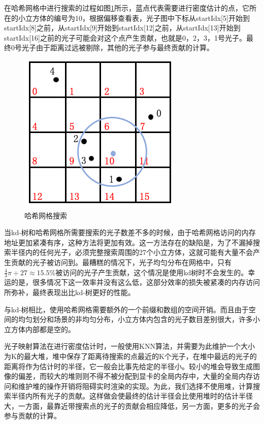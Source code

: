 \documentclass[UTF8]{ctexart}
\begin{document}
    在哈希网格中进行搜索的过程如图\ref{fig:2}所示，蓝点代表需要进行密度估计的点，它所在的小立方体的编号为10，根据偏移查看表，光子图中下标从startIdx[5]开始到startIdx[8]之前，从startIdx[9]开始到startIdx[12]之前，从startIdx[13]开始到startIdx[16]之前的光子可能会对这个点产生贡献，也就是0，2，3，1号光子。最终0号光子由于距离过远被剔除，其他的光子参与最终贡献的计算。
    
    \begin{figure}[htbp]
    \centering
    \includegraphics[scale=0.6]{pic/HashGridSearch.png}
    \caption{哈希网格搜索}
    \label{fig:2}
    \end{figure}
    
    当kd-树和哈希网格所需要搜索的光子数差不多的时候，由于哈希网格访问的内存地址更加紧凑有序，这种方法将更加有效。这一方法存在的缺陷是，为了不漏掉搜索半径内的任何光子，必须完整搜索周围的27个小立方体，这就可能有大量不会产生贡献的光子被访问到。最糟糕的情况下，光子均匀分布在网格中，只有$\frac{4}{3}\pi\div27\approx15.5\%$被访问的光子产生贡献，这个情况是使用kd树时不会发生的。幸运的是，很多情况下这一效率并没有这么低，这部分效率的损失被紧凑的内存访问所弥补，最终表现出比kd-树更好的性能。
    
    与kd-树相比，使用哈希网格需要额外的一个前缀和数组的空间开销。而且由于空间的均匀划分和场景的非均匀分布，小立方体内包含的光子数目差别很大，许多小立方体内部都是空的。
    
    光子映射算法在进行密度估计时，一般使用KNN算法，并需要为此维护一个大小为K的最大堆\cite{jensen2000practical}，堆中保存了距离待搜索的点最近的K个光子，在堆中最远的光子的距离将作为估计时的半径，它一般会比事先给定的半径小\cite{2003Photon}。较小的堆会导致生成图像的偏差，而较大的堆则则不得不被分配到显卡的全局内存中，大量的全局内存访问和维护堆的操作开销将阻碍实时渲染的实现。为此，我们选择不使用堆，计算搜索半径内所有光子的贡献。这样做会使最终的估计半径会比使用堆时的估计半径大，一方面，最靠近带搜索点的光子的贡献会相应降低，另一方面，更多的光子会参与贡献的计算。
    
\end{document}
